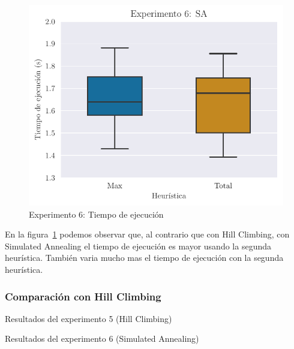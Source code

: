\begin{figure}[H]
    \centering
    \includegraphics{include/plots/ex6fix_time_bplot.pdf}
    \caption{Experimento 6: Tiempo de ejecución}%
    \label{fig:ex6time}
\end{figure}

En la figura~\ref{fig:ex6time} podemos observar que, al contrario que con Hill Climbing, con Simulated Annealing
el tiempo de ejecución es mayor usando la segunda heurística. También varia mucho mas el tiempo de ejecución
con la segunda heurística.

\subsubsection{Comparación con Hill Climbing}

\vspace{-1.4em}
\begin{table}[H]
    \caption{Resultados del experimento 5 (Hill Climbing)}%
    \label{tab:ex5_comp}
    \vspace{-1.4em}
    \begin{center}
    
    \end{center}
    \caption{Resultados del experimento 6 (Simulated Annealing)}%
    \label{tab:ex6_comp}
    \vspace{-1.4em}
    \begin{center}
    
    \end{center}
\end{table}

